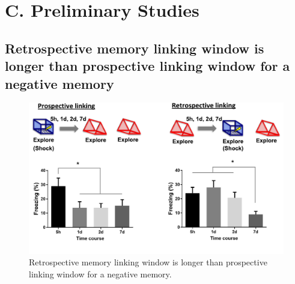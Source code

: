 \documentclass[master.tex]{subfiles}
\begin{document}
\section*{C. Preliminary Studies}

\subsection*{Retrospective memory linking window is longer than prospective
  linking window for a negative memory}


\begin{figure}[!h]
  \centering \includegraphics[scale = .15]{Figures/pro_retro_prelim.pdf}
  \caption{\footnotesize Retrospective memory linking window is longer than
    prospective linking window for a negative memory.}
  \label{fig:prelim_pro_retro}
\end{figure}
\end{document}
